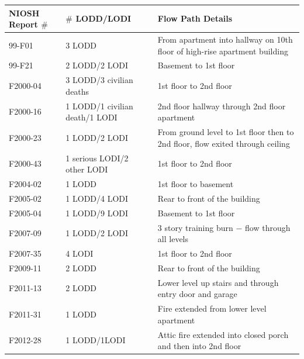 \documentclass[11pt,oneside]{book}
\begin{document}
\begin{table}
\centering
{}\label{tab:lodd}
\begin{tabular}{l l l}
\toprule[1.5pt]
NIOSH Report $\#$ & $\#$ LODD/LODI & Flow Path Details  \\
\midrule
\multirow{2}{*}{99-F01 \cite{NIOSH:Pettit} }    & \multirow{2}{*}{3 LODD}                                     & \multirow{2}{*}{\parbox{8cm} {From apartment into hallway on 10th floor of high-rise apartment building}} \\
                 &                                                    & \\
99-F21 \cite{NIOSH:Washenitz}         & 2 LODD/2 LODI                          & Basement to 1st floor \\
F2000-04 \cite{NIOSH:Mezzanotte}   & 3 LODD/3 civilian deaths            & 1st floor to 2nd floor \\
F2000-16 \cite{NIOSH:McFall} & 1 LODD/1 civilian death/1 LODI & 2nd floor hallway through 2nd floor apartment \\
\multirow{2}{*}{F2000-23 \cite{NIOSH:McFall2}} & \multirow{2}{*}{1 LODD/2 LODI       }                   & \multirow{2}{*}{\parbox{8cm} {From ground level to 1st floor then to 2nd floor, flow exited through ceiling}} \\
                 &                                                    & \\
F2000-43 \cite{NIOSH:McFall3}         & 1 serious LODI/2 other LODI      & 1st floor to 2nd floor \\
F2004-02  \cite{NIOSH:Berardinelli}  & 1 LODD                                       & 1st floor to basement \\
F2005-02 \cite{NIOSH:Koedam}        & 1 LODD/4 LODI                           & Rear to front of the building \\
F2005-04 \cite{NIOSH:McFall4}         & 1 LODD/9 LODI                           & Basement to 1st floor \\
F2007-09 \cite{NIOSH:Tarley}           & 1 LODD/2 LODI                           & 3 story training burn $-$ flow through all levels \\
F2007-35 \cite{NIOSH:Braddee}       & 4 LODI                                         & 1st floor to 2nd floor \\
F2009-11 \cite{NIOSH:Merinar}         & 2 LODD                                        & Rear to front of the building \\
F2011-13 \cite{NIOSH:Bowyer2}       & 2 LODD                                        & Lower level up stairs and through entry door and garage \\
F2011-31 \cite{NIOSH:Loflin}            & 1 LODD                                        & Fire extended from lower level apartment \\
F2012-28 \cite{NIOSH:Bowyer}        & 1 LODD/1LODI                            & Attic fire extended into closed porch and then into 2nd floor \\
\bottomrule[1.25pt]
\end{tabular}\par
\end{table}
\end{document}
